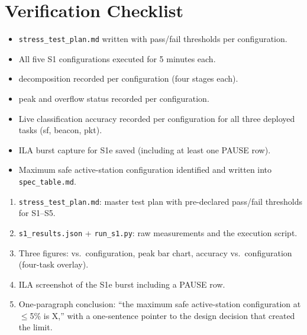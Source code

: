 \documentclass[11pt,letterpaper]{article}
\begin{document}
\section{Verification Checklist}
\begin{itemize}[leftmargin=2em]
	\item[$\square$] \texttt{stress\_test\_plan.md} written with pass/fail thresholds per configuration.
	\item[$\square$] All five S1 configurations executed for 5 minutes each.
	\item[$\square$] \PER{} decomposition recorded per configuration (four stages each).
	\item[$\square$] \FIFO{} peak and overflow status recorded per configuration.
	\item[$\square$] Live classification accuracy recorded per configuration for all three deployed tasks (sf, beacon, pkt).
	\item[$\square$] \mbox{ILA{}} burst capture for S1e saved (including at least one PAUSE row).
	\item[$\square$] Maximum safe active-station configuration identified and written into \texttt{spec\_table.md}.
\end{itemize}

\begin{tcolorbox}[deliverable={Lab Handout 5-A Deliverable}]
	\begin{enumerate}[leftmargin=1.2em]
		\item \texttt{stress\_test\_plan.md}: master test plan with pre-declared pass/fail thresholds for S1--S5.
		\item \texttt{s1\_results.json} + \texttt{run\_s1.py}: raw measurements and the execution script.
		\item Three figures: \PER{} vs.\ configuration, \FIFO{} peak bar chart, accuracy vs.\ configuration (four-task overlay).
		\item \mbox{ILA{}} screenshot of the S1e burst including a PAUSE row.
		\item One-paragraph conclusion: ``the maximum safe active-station configuration at $\leq$5\% \PER{} is X,'' with a one-sentence pointer to the design decision that created the limit.
	\end{enumerate}
\end{tcolorbox}

\printhandoutglossary
\end{document}

